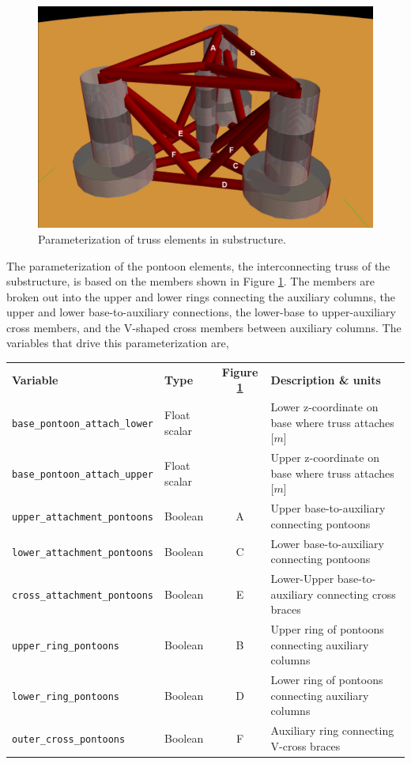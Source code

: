 \begin{figure}
  \begin{center}
    \includegraphics[width=4.5in]{figs/semi}
    \caption{Parameterization of truss elements in substructure.}
    \label{fig:pontoon}
  \end{center}
\end{figure}

The parameterization of the pontoon elements, the interconnecting truss
of the substructure, is based on the members shown in Figure
\ref{fig:pontoon}.  The members are broken out into the upper and lower
rings connecting the auxiliary columns, the upper and lower
base-to-auxiliary connections, the lower-base to upper-auxiliary cross
members, and the V-shaped cross members between auxiliary columns.  The
variables that drive this parameterization are,

{\footnotesize
  \begin{tabularx}{\linewidth}{ l l c X }
    \textbf{Variable} & \textbf{Type} & \textbf{Figure \ref{fig:pontoon}} & \textbf{Description \& units} \\
    \texttt{base\_pontoon\_attach\_lower} & Float scalar & & Lower z-coordinate on base where truss attaches [$m$]\\
    \texttt{base\_pontoon\_attach\_upper} & Float scalar & & Upper z-coordinate on base where truss attaches [$m$]\\
    \texttt{upper\_attachment\_pontoons} & Boolean & A & Upper base-to-auxiliary connecting pontoons\\
    \texttt{lower\_attachment\_pontoons} & Boolean & C & Lower base-to-auxiliary connecting pontoons\\
    \texttt{cross\_attachment\_pontoons} & Boolean & E & Lower-Upper base-to-auxiliary connecting cross braces\\
    \texttt{upper\_ring\_pontoons} & Boolean & B & Upper ring of pontoons connecting auxiliary columns\\
    \texttt{lower\_ring\_pontoons} & Boolean & D & Lower ring of pontoons connecting auxiliary columns\\
    \texttt{outer\_cross\_pontoons} & Boolean & F & Auxiliary ring connecting V-cross braces\\
  \end{tabularx}
}


